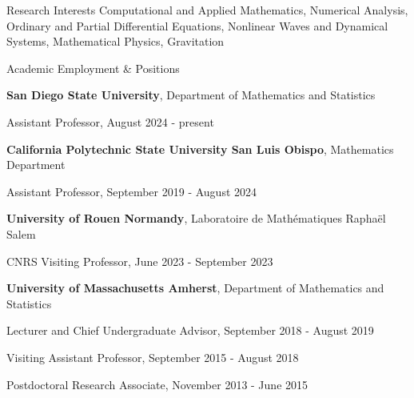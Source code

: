 \documentclass[10pt]{article} %
\newenvironment{outerlist}[1][\enskip\textbullet]%
        {\begin{itemize}[#1]}{\end{itemize}%
         \vspace{-.6\baselineskip}}
\newenvironment{innerlist}[1][\enskip\textbullet]%
        {\begin{compactitem}[#1]}{\end{compactitem}}
\begin{document}
\begin{section}{Research Interests}
\vskip -4.2mm
Computational and Applied Mathematics, Numerical Analysis, Ordinary and Partial Differential Equations, Nonlinear Waves and Dynamical Systems, Mathematical Physics, Gravitation

\end{section}

\begin{section}{Academic Employment \& Positions}
\vspace{-6.9mm}
\begin{outerlist}
\item[$\bullet$]
\textbf{San Diego State University}, Department of Mathematics and Statistics
\begin{innerlist}
\item [$\triangleright$] Assistant Professor, August 2024 - present
\end{innerlist}
\item[$\bullet$]
\textbf{California Polytechnic State University San Luis Obispo}, Mathematics Department
\begin{innerlist}
\item [$\triangleright$] Assistant Professor, September 2019 - August 2024
\end{innerlist}
\item[$\bullet$]
\textbf{University of Rouen Normandy}, Laboratoire de Math\'ematiques Rapha\"el Salem
\begin{innerlist}
\item [$\triangleright$] CNRS Visiting Professor, June 2023 - September 2023
\end{innerlist}
\item[$\bullet$]
\textbf{University of Massachusetts Amherst}, Department of
Mathematics and Statistics
\begin{innerlist}
\item [$\triangleright$] Lecturer and Chief Undergraduate Advisor, September 2018 - August 2019
\item [$\triangleright$] Visiting Assistant Professor, September 2015 - August 2018
\item [$\triangleright$] Postdoctoral Research Associate, November 2013 - June 2015
\end{innerlist}

\end{outerlist}
\end{section}
\end{document}
